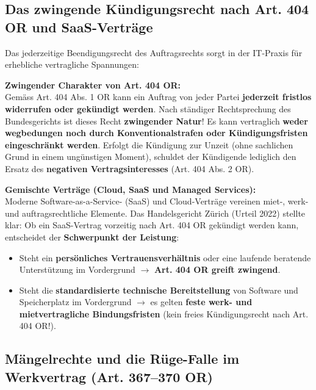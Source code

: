 \subsection{Das zwingende Kündigungsrecht nach Art. 404 OR und SaaS-Verträge}

Das jederzeitige Beendigungsrecht des Auftragsrechts sorgt in der IT-Praxis für erhebliche vertragliche Spannungen:

\begin{theorem}
    \textbf{Zwingender Charakter von Art. 404 OR:} \\
    Gemäss Art. 404 Abs. 1 OR kann ein Auftrag von jeder Partei \textbf{jederzeit fristlos widerrufen oder gekündigt werden}. Nach ständiger Rechtsprechung des Bundesgerichts ist dieses Recht \textbf{zwingender Natur}! Es kann vertraglich \textbf{weder wegbedungen noch durch Konventionalstrafen oder Kündigungsfristen eingeschränkt werden}. Erfolgt die Kündigung zur Unzeit (ohne sachlichen Grund in einem ungünstigen Moment), schuldet der Kündigende lediglich den Ersatz des \textbf{negativen Vertragsinteresses} (Art. 404 Abs. 2 OR).
\end{theorem}

\begin{definition}
    \textbf{Gemischte Verträge (Cloud, SaaS und Managed Services):} \\
    Moderne Software-as-a-Service- (SaaS) und Cloud-Verträge vereinen miet-, werk- und auftragsrechtliche Elemente. Das Handelsgericht Zürich (Urteil 2022) stellte klar: Ob ein SaaS-Vertrag vorzeitig nach Art. 404 OR gekündigt werden kann, entscheidet der \textbf{Schwerpunkt der Leistung}:
    \begin{itemize}
        \item Steht ein \textbf{persönliches Vertrauensverhältnis} oder eine laufende beratende Unterstützung im Vordergrund $\to$ \textbf{Art. 404 OR greift zwingend}.
        \item Steht die \textbf{standardisierte technische Bereitstellung} von Software und Speicherplatz im Vordergrund $\to$ es gelten \textbf{feste werk- und mietvertragliche Bindungsfristen} (kein freies Kündigungsrecht nach Art. 404 OR!).
    \end{itemize}
\end{definition}

\subsection{Mängelrechte und die Rüge-Falle im Werkvertrag (Art. 367--370 OR)}

